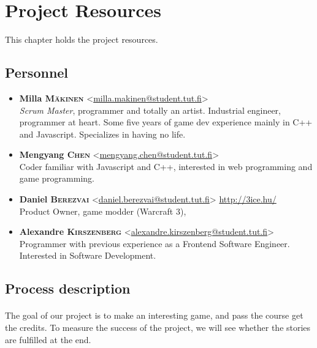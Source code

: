 \section{Project Resources}

This chapter holds the project resources.

\subsection{Personnel}

\begin{itemize}
  \item \textbf{Milla \textsc{Mäkinen}} <\href{mailto:milla.makinen@student.tut.fi}{milla.makinen@student.tut.fi}> \\
        \emph{Scrum Master}, programmer and totally an artist. Industrial engineer, programmer at heart. Some five years of game dev experience mainly in C++ and Javascript. Specializes in having no life.
  \item \textbf{Mengyang \textsc{Chen}} <\href{mailto:mengyang.chen@student.tut.fi}{mengyang.chen@student.tut.fi}> \\
        Coder familiar with Javascript and C++, interested in web programming and game programming.
  \item \textbf{Daniel \textsc{Berezvai}} <\href{mailto:daniel.berezvai@student.tut.fi}{daniel.berezvai@student.tut.fi}> \href{http://3ice.hu/}{http://3ice.hu/} \\
        Product Owner, game modder (Warcraft 3),
  \item \textbf{Alexandre \textsc{Kirszenberg}} <\href{mailto:alexandre.kirszenberg@student.tut.fi}{alexandre.kirszenberg@student.tut.fi}>
        Programmer with previous experience as a Frontend Software Engineer. Interested in Software Development.
\end{itemize}

\subsection{Process description}

\paragraph{} The goal of our project is to make an interesting game, and pass the  course get the credits. To measure the success of the project, we will see whether the stories are fulfilled at the end.

